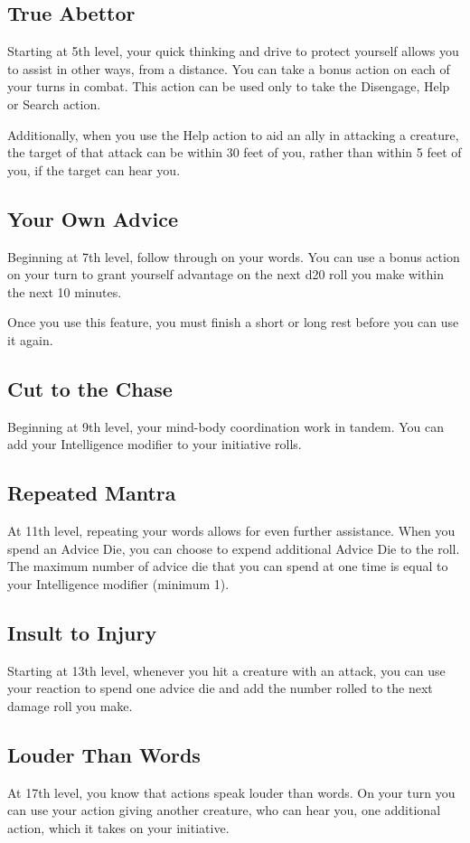 \documentclass[letterpaper,openany,twoside,twocolumn]{book}
\begin{document}
	\subsection*{True Abettor}
	Starting at 5th level, your quick thinking and drive to protect yourself allows you to assist in other ways, from a distance. You can take a bonus action on each of your turns in combat. This action can be used only to take the Disengage, Help or Search action.
	
	Additionally, when you use the Help action to aid an ally in attacking a creature, the target of that attack can be within 30 feet of you, rather than within 5 feet of you, if the target can hear you.
	
	\subsection*{Your Own Advice}
	Beginning at 7th level, follow through on your words. You can use a bonus action on your turn to grant yourself advantage on the next d20 roll you make within the next 10 minutes.
	
	Once you use this feature, you must finish a short or long rest before you can use it again.
	
	\subsection*{Cut to the Chase}
	Beginning at 9th level, your mind-body coordination work in tandem. You can add your Intelligence modifier to your initiative rolls.
	
	\subsection*{Repeated Mantra}
	At 11th level, repeating your words allows for even further assistance. When you spend an Advice Die, you can choose to expend additional Advice Die to the roll. The maximum number of advice die that you can spend at one time is equal to your Intelligence modifier (minimum 1).
	
	\subsection*{Insult to Injury}
	Starting at 13th level, whenever you hit a creature with an attack, you can use your reaction to spend one advice die and add the number rolled to the next damage roll you make.
	
	\subsection*{Louder Than Words}
	At 17th level, you know that actions speak louder than words. On your turn you can use your action giving another creature, who can hear you, one additional action, which it takes on your initiative.
	
\end{document}
